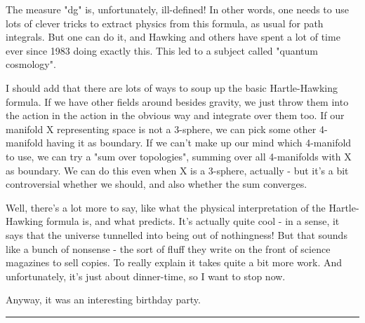 The measure "dg" is, unfortunately, ill-defined!  In other words, one
needs to use lots of clever tricks to extract physics from this formula, 
as usual for path integrals.  But one can do it, and Hawking and others 
have spent a lot of time ever since 1983 doing exactly this.  This led 
to a subject called "quantum cosmology".

I should add that there are lots of ways to soup up the basic
Hartle-Hawking formula.  If we have other fields around besides
gravity, we just throw them into the action in the action in the
obvious way and integrate over them too.  If our manifold X representing
space is not a 3-sphere, we can pick some other 4-manifold having it
as boundary.  If we can't make up our mind which 4-manifold to use, 
we can try a "sum over topologies", summing over all 4-manifolds
with X as boundary.  We can do this even when X is a 3-sphere, 
actually - but it's a bit controversial whether we should, and 
also whether the sum converges.  

Well, there's a lot more to say, like what the physical interpretation
of the Hartle-Hawking formula is, and what predicts.  It's actually quite 
cool - in a sense, it says that the universe tunnelled into being out of 
nothingness!  But that sounds like a bunch of nonsense - the sort of fluff 
they write on the front of science magazines to sell copies.  To really 
explain it takes quite a bit more work.  And unfortunately, it's just 
about dinner-time, so I want to stop now.  

Anyway, it was an interesting birthday party.  


 \par\noindent\rule{\textwidth}{0.4pt}

